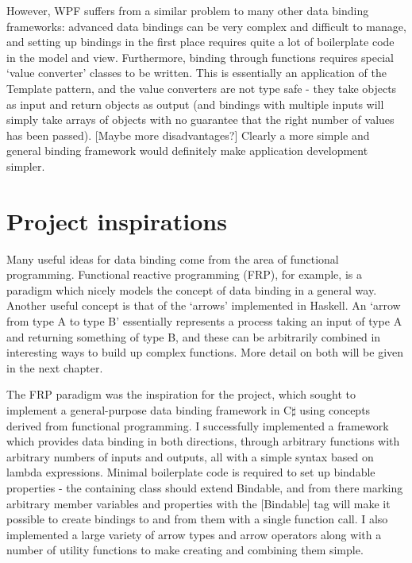 \documentclass[12pt,twoside,notitlepage]{report}
\begin{document}
However, WPF suffers from a similar problem to many other data binding frameworks: advanced data bindings can be very complex and difficult to manage, and setting up bindings in the first place requires quite a lot of boilerplate code in the model and view. Furthermore, binding through functions requires special ‘value converter’ classes to be written. This is essentially an application of the Template pattern, and the value converters are not type safe - they take objects as input and return objects as output (and bindings with multiple inputs will simply take arrays of objects with no guarantee that the right number of values has been passed). [Maybe more disadvantages?] Clearly a more simple and general binding framework would definitely make application development simpler.

\section{Project inspirations}

Many useful ideas for data binding come from the area of functional programming. Functional reactive programming (FRP), for example, is a paradigm which nicely models the concept of data binding in a general way. Another useful concept is that of the ‘arrows’ implemented in Haskell. An ‘arrow from type A to type B’ essentially represents a process taking an input of type A and returning something of type B, and these can be arbitrarily combined in interesting ways to build up complex functions. More detail on both will be given in the next chapter.

The FRP paradigm was the inspiration for the project, which sought to implement a general-purpose data binding framework in C$\sharp$ using concepts derived from functional programming. I successfully implemented a framework which provides data binding in both directions, through arbitrary functions with arbitrary numbers of inputs and outputs, all with a simple syntax based on lambda expressions. Minimal boilerplate code is required to set up bindable properties - the containing class should extend Bindable, and from there marking arbitrary member variables and properties with the [Bindable] tag will make it possible to create bindings to and from them with a single function call. I also implemented a large variety of arrow types and arrow operators along with a number of utility functions to make creating and combining them simple.

\cleardoublepage
\end{document}
